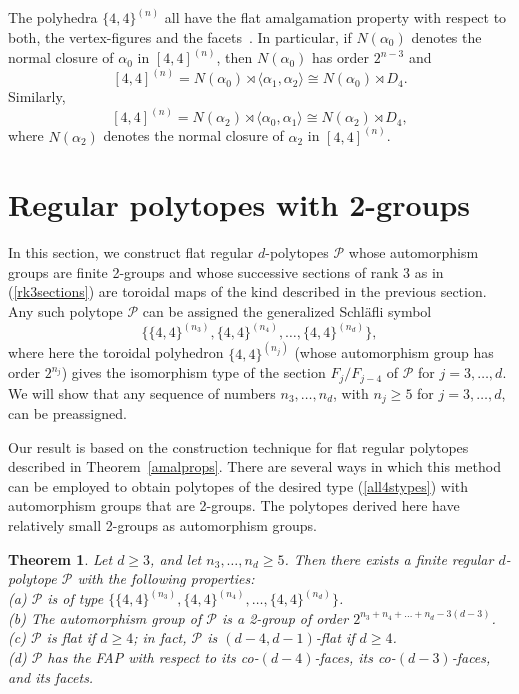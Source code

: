 \documentclass[12pt]{amsart}
\newtheorem{theorem}{Theorem}[section]
\theoremstyle{definition}
\begin{document}
The polyhedra $\{4,4\}^{(n)}$ all have the flat amalgamation property with respect to both, the vertex-figures and the facets~\cite{Sch1988}. In particular, if $N(\alpha_0)$ denotes the normal closure of $\alpha_0$ in $[4,4]^{(n)}$, then $N(\alpha_0)$ has order $2^{n-3}$ and
\begin{equation}
\label{torfap1}
[4,4]^{(n)} = N(\alpha_0)\rtimes\langle\alpha_1,\alpha_2\rangle 
\cong N(\alpha_0) \rtimes D_4 .
\end{equation}
Similarly, 
\begin{equation}
\label{torfap2}
[4,4]^{(n)} = N(\alpha_2)\rtimes\langle\alpha_0,\alpha_1\rangle 
\cong N(\alpha_2)\rtimes D_4 ,
\end{equation}
where $N(\alpha_2)$ denotes the normal closure of $\alpha_2$ in $[4,4]^{(n)}$.
\medskip

\section{Regular polytopes with 2-groups}
\label{regpols2}
\medskip

In this section, we construct flat regular $d$-polytopes $\mathcal P$ whose automorphism groups are finite 2-groups and whose successive sections of rank 3 as in (\ref{rk3sections}) are toroidal maps of the kind described in the previous section. Any such polytope $\mathcal P$ can be assigned the generalized Schl\"afli symbol
\begin{equation}
\label{all4stypes}
\{\{4,4\}^{(n_3)},\{4,4\}^{(n_4)},\ldots,\{4,4\}^{(n_{d})}\},
\end{equation}
where here the toroidal polyhedron $\{4,4\}^{(n_j)}$ (whose automorphism group has order $2^{n_j}$) gives the isomorphism type of the section 
$F_{j}/F_{j-4}$ of $\mathcal P$ for $j=3,\ldots,d$.  We will show that any sequence of numbers $n_3,\ldots,n_d$, with $n_{j}\geq 5$ for $j=3,\ldots,d$, can be preassigned. 
\smallskip

Our result is based on the construction technique for flat regular polytopes described in Theorem~\ref{amalprops}. There are several ways in which this method can be employed to obtain polytopes of the desired type (\ref{all4stypes}) with automorphism groups that are 2-groups. The polytopes derived here have relatively small 2-groups as automorphism groups.

\begin{theorem}
\label{flat44thm}
Let $d\geq 3$, and let $n_3,\ldots,n_d\geq 5$. Then there exists a finite regular $d$-polytope $\mathcal P$ with the following properties:\\[.02in]
(a) $\mathcal P$ is of type $\{\{4,4\}^{(n_3)},\{4,4\}^{(n_4)},\ldots,\{4,4\}^{(n_{d})}\}$.\\[.02in]
(b) The automorphism group of $\mathcal P$ is a 2-group of order 
$2^{n_3+n_4+\ldots+n_d - 3(d-3)}$.\\[.02in]
(c) $\mathcal P$ is flat if $d\geq 4$; in fact, $\mathcal P$ is $(d-4,d-1)$-flat if $d\geq 4$.\\[.02in]
(d) $\mathcal P$ has the FAP with respect to its co-$(d-4)$-faces, its co-$(d-3)$-faces, and its facets.
\end{theorem}
\end{document}

